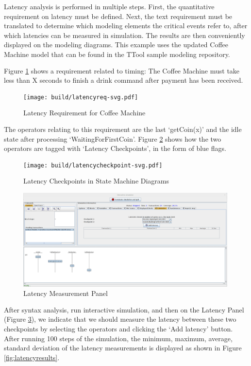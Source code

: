 \documentclass[12pt]{article}
\begin{document}
Latency analysis is performed in multiple steps. First, the quantitative requirement on latency must be defined. Next, the text requirement must be translated to determine which modeling elements the critical events refer to, after which latencies can be measured in simulation. The results are then conveniently displayed on the modeling diagrams. This example uses the updated Coffee Machine model that can be found in the TTool sample modeling repository.

Figure \ref{fig:latencyreq} shows a requirement related to timing: The Coffee Machine must take less than X seconds to finish a drink command after payment has been received. 

\begin{figure}[htbp]
\centering
\texttt{[image: build/latencyreq-svg.pdf]}
\caption{Latency Requirement for Coffee Machine} \label{fig:latencyreq}
\end{figure}

The operators relating to this requirement are the last `getCoin(x)' and the idle state after processing `WaitingForFirstCoin'. Figure \ref{fig:latencycheckpoint} shows how the two operators are tagged with `Latency Checkpoints', in the form of blue flags.

\begin{figure}[htbp]
\centering
\texttt{[image: build/latencycheckpoint-svg.pdf]}
\caption{Latency Checkpoints in State Machine Diagrams} \label{fig:latencycheckpoint}
\end{figure}


\begin{figure}[htbp]
\centering
\includegraphics[width=0.99\textwidth]{fig/latencymeasure.png}
\caption{Latency Measurement Panel} \label{fig:latencymeasurement}
\end{figure}

After syntax analysis, run interactive simulation, and then on the Latency Panel (Figure \ref{fig:latencymeasurement}), we indicate that we should measure the latency between these two checkpoints by selecting the operators and clicking the `Add latency' button. After running 100 steps of the simulation, the minimum, maximum, average, standard deviation of the latency measurements is displayed as shown in Figure \ref{fig:latencyresults}.
\end{document}
